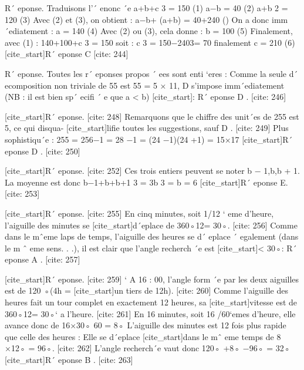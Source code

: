 R´ eponse. Traduisons l’´ enonc ´e
 a+b+c
 3
 = 150 (1)
 a−b = 40 (2)
 a+b
 2
 = 120 (3)
 Avec (2) et (3), on obtient :
 a−b+ (a+b) = 40+240 ()
 On a donc imm´ediatement : 
 a = 140 (4)
 Avec (2) ou (3), cela donne :
 b = 100 (5)
 Finalement, avec (1) :
 140+100+c
 3
 = 150
 soit :
 c
 3
 = 150−2403= 70
 finalement
 c = 210 (6)
 [cite_start]R´ eponse C [cite: 244]

R´ eponse. Toutes les r´ eponses propos ´ ees sont enti `eres : Comme la seule 
 d´ ecomposition non triviale de 55 est 55 = 5 × 11, D s’impose imm´ediatement 
 (NB : il est bien sp´ ecifi ´ e que a < b) [cite_start]: R´ eponse D . [cite: 246]

[cite_start]R´ eponse. [cite: 248]
Remarquons que le chiffre des unit´es de 255 est 5, ce qui disqua- 
 [cite_start]lifie toutes les suggestions, sauf D . [cite: 249]
Plus sophistiqu´e : 
 255 = 256−1 = 28 −1 = (24 −1)(24 +1) = 15×17
 [cite_start]R´ eponse D . [cite: 250]

[cite_start]R´ eponse. [cite: 252]
Ces trois entiers peuvent se noter b − 1,b,b + 1. La moyenne est
 donc
 b−1+b+b+1
 3
 =
 3b
 3
 = b = 6
 [cite_start]R´ eponse E. [cite: 253]

[cite_start]R´ eponse. [cite: 255]
En cinq minutes, soit 1/12
 `
 eme d’heure, l’aiguille des minutes se
 [cite_start]d´eplace de 360◦12= 30◦. [cite: 256]
Comme dans le mˆeme laps de temps, l’aiguille des heures 
 se d´ eplace ´ egalement (dans le m ˆ eme sens. . .), il est clair que l’angle recherch ´e est 
 [cite_start]< 30◦: R´ eponse A . [cite: 257]

[cite_start]R´ eponse. [cite: 259]
` 
 A 16 : 00, l’angle form ´e par les deux aiguilles est de 120 ◦(4h =
 [cite_start]un tiers de 12h). [cite: 260]
Comme l’aiguille des heures fait un tour complet en exactement 12 heures, sa
 [cite_start]vitesse est de 360◦12= 30◦` a l’heure. [cite: 261]
En 16 minutes, soit 16 /60`emes d’heure, elle
 avance donc de
 16×30◦
 60
 = 8◦
 L’aiguille des minutes est 12 fois plus rapide que celle des heures : Elle se d´eplace 
 [cite_start]dans le mˆ eme temps de 8 ×12◦ = 96◦. [cite: 262]
L’angle recherch´e vaut donc 
 120◦ +8◦ −96◦ = 32◦
 [cite_start]R´ eponse B . [cite: 263]

